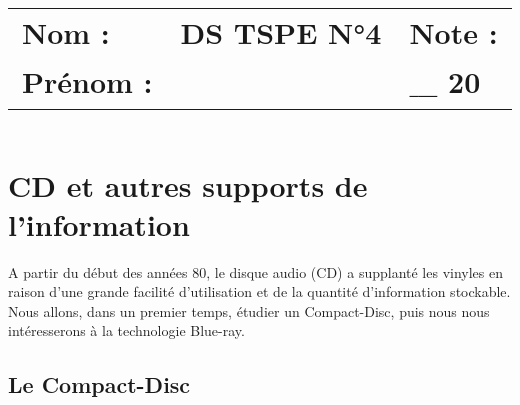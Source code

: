 \documentclass[a4paper,11pt,fleqn]{article}%
\title{\vspace{-1cm}\large 
	\begin{tabular}{|m{5cm}|>{\centering}m{8cm}|>{\centering\arraybackslash}m{4cm}|}
		\hline
		Nom : & \textbf{\textsc{DS TSPE N°4}} &  Note : \\
		Prénom : & & $\_\_\_$ \textbf{20} \\ \hline
\end{tabular}}
\date{}
\begin{document}
\maketitle
\vspace{-2.5cm}
\section{CD et autres supports de l'information}
A partir du début des années 80, le disque audio (CD) a supplanté les vinyles en raison d'une grande facilité d'utilisation et de la quantité d'information stockable. Nous allons, dans un premier temps, étudier un Compact-Disc, puis nous nous intéresserons à la technologie Blue-ray.
\subsection{Le Compact-Disc}
\end{document}

